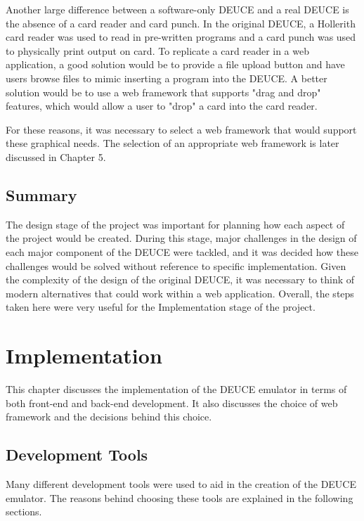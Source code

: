 \documentclass{l4proj}
\begin{document}
Another large difference between a software-only DEUCE and a real DEUCE is the absence of a card reader and card punch. In the original DEUCE, a Hollerith card reader was used to read in pre-written programs and a card punch was used to physically print output on card. To replicate a card reader in a web application, a good solution would be to provide a file upload button and have users browse files to mimic inserting a program into the DEUCE. A better solution would be to use a web framework that supports "drag and drop" features, which would allow a user to "drop" a card into the card reader. 
	
For these reasons, it was necessary to select a web framework that would support these graphical needs. The selection of an appropriate web framework is later discussed in Chapter 5.

\section{Summary}
The design stage of the project was important for planning how each aspect of the project would be created. During this stage, major challenges in the design of each major component of the DEUCE were tackled, and it was decided how these challenges would be solved without reference to specific implementation. Given the complexity of the design of the original DEUCE, it was necessary to think of modern alternatives that could work within a web application. Overall, the steps taken here were very useful for the Implementation stage of the project.

\chapter{Implementation}
This chapter discusses the implementation of the DEUCE emulator in terms of both front-end and back-end development. It also discusses the choice of web framework and the decisions behind this choice. 

\section{Development Tools}
Many different development tools were used to aid in the creation of the DEUCE emulator. The reasons behind choosing these tools are explained in the following sections.
\end{document}
